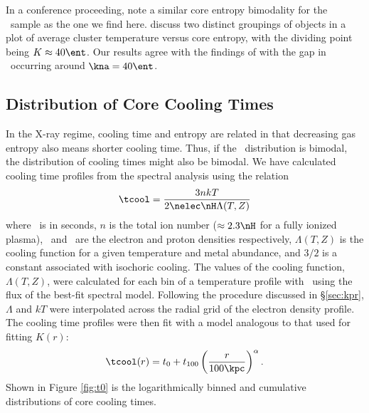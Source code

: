 \documentclass{emulateapj}
\begin{document}
In a conference proceeding, \cite{2007hvcg.conf...42H} note a similar
core entropy bimodality for the \hifl\ sample as the one we find here.
\cite{2007hvcg.conf...42H} discuss two distinct groupings of objects in
a plot of average cluster temperature versus core entropy, with the
dividing point being $K \approx 40 \ent$. Our results agree with the
findings of \cite{2007hvcg.conf...42H} with the gap in \kna\ occurring
around $\kna = 40 \ent$.


\subsection{Distribution of Core Cooling Times}
\label{sec:hifl}

In the X-ray regime, cooling time and entropy are related in that
decreasing gas entropy also means shorter cooling time. Thus, if the
\kna\ distribution is bimodal, the distribution of cooling times might
also be bimodal. We have calculated cooling time profiles from the
spectral analysis using the relation
\begin{equation}
\tcool = \frac{3nkT}{2\nelec \nH \Lambda(T,Z)}
\label{eqn:tcool}
\end{equation}
where \tcool\ is in seconds, $n$ is the total ion number ($\approx
2.3\nH$ for a fully ionized plasma), \nelec\ and \nH\ are the electron
and proton densities respectively, $\Lambda(T,Z)$ is the cooling
function for a given temperature and metal abundance, and $3/2$ is a
constant associated with isochoric cooling. The values of the cooling
function, $\Lambda(T,Z)$, were calculated for each bin of a
temperature profile with \xspec\ using the flux of the best-fit
spectral model. Following the procedure discussed in
\S\ref{sec:kpr}, $\Lambda$ and $kT$ were interpolated across the
radial grid of the electron density profile. The cooling time profiles
were then fit with a model analogous to that used for fitting $K(r)$:
\begin{equation}
\tcool(r) = t_0 + t_{100} \left(\frac{r}{100 \kpc}\right)^{\alpha}.\nonumber \\
\end{equation}
Shown in Figure \ref{fig:t0} is the logarithmically binned and
cumulative distributions of core cooling times.
\end{document}
